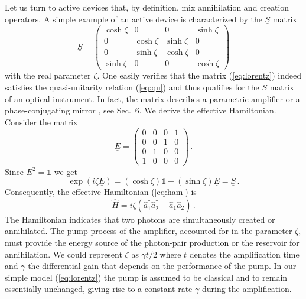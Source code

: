 \documentclass[12pt,amsmath,amssymb]{article}
\numberwithin{equation}{section}
\begin{document}
Let us turn to active devices that, by definition, mix
annihilation and creation operators.
A simple example of an active device
is characterized by the $\underline{S}$ matrix
\begin{equation}
\label{eq:lorentz} \underline{S} =
    \left(
    \begin{array}{cccc}
      \cosh\zeta&0&0&\sinh\zeta\\ 0&\cosh\zeta&\sinh\zeta&0\\
      0&\sinh\zeta&\cosh\zeta&0\\ \sinh\zeta&0&0&\cosh\zeta
    \end{array}
\right)
\end{equation}
with the real parameter $\zeta$. One easily verifies that the
matrix (\ref{eq:lorentz}) indeed satisfies the quasi-unitarity relation
(\ref{eq:qu}) and thus qualifies for the $\underline{S}$ matrix
of an optical instrument. In fact, the matrix describes a
parametric amplifier \cite{Shen} or a phase-conjugating mirror
\cite{Shen}, see Sec.\ 6. We derive the effective Hamiltonian.
Consider the matrix
\begin{equation}
\underline{E} =
    \left(
    \begin{array}{cccc}
      0&0&0&1\\0&0&1&0\\0&1&0&0\\1&0&0&0
    \end{array}
\right) \,.
\end{equation}
Since $\underline{E}^2 = \mathds{1}$ we get
\begin{equation}
\exp(i\zeta\underline{E}) = (\cosh\zeta)\mathds{1} + (\sinh\zeta)
\underline{E} = \underline{S} \,.
\end{equation}
Consequently, the effective Hamiltonian (\ref{eq:ham}) is
\begin{equation}
\label{eq:hamp} \hat{H} = i\zeta\left(
\hat{a}_1^\dagger\hat{a}_2^\dagger-\hat{a}_1\hat{a}_2 \right) \,.
\end{equation}
The Hamiltonian indicates that two photons are simultaneously
created or annihilated. The pump process of the amplifier,
accounted for in the parameter $\zeta$, must provide the energy
source of the photon-pair production or the reservoir for
annihilation. We could represent $\zeta$ as $\gamma t /2$ where
$t$ denotes the amplification time and $\gamma$ the differential
gain that depends on the performance of the pump. In our simple
model (\ref{eq:lorentz}) the pump is assumed to be classical and
to remain essentially unchanged, giving rise to a constant rate
$\gamma$ during the amplification.
\end{document}
